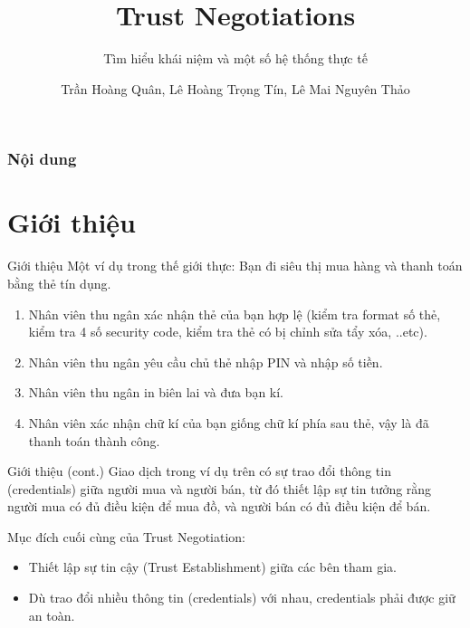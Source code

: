\documentclass[11pt]{beamer}
\newcommand{\eg}{\text{e.g.\ }}
\begin{document}
\author{Trần Hoàng Quân, Lê Hoàng Trọng Tín, Lê Mai Nguyên Thảo}
\title{Trust Negotiations}
\subtitle{Tìm hiểu khái niệm và một số hệ thống thực tế}
\begin{frame}[plain]
\maketitle
\end{frame}

\begin{frame}
\frametitle{Nội dung}
\tableofcontents
\end{frame}

\section{Giới thiệu}
\begin{frame}{Giới thiệu}
Một ví dụ trong thế giới thực: Bạn đi siêu thị mua hàng và thanh toán bằng thẻ tín dụng.
\begin{enumerate}
\item Nhân viên thu ngân xác nhận thẻ của bạn hợp lệ (\eg kiểm tra format số thẻ, kiểm tra 4 số security code, kiểm tra thẻ có bị chỉnh sửa tẩy xóa, ..etc).
\item Nhân viên thu ngân yêu cầu chủ thẻ nhập PIN và nhập số tiền.
\item Nhân viên thu ngân in biên lai và đưa bạn kí.
\item Nhân viên xác nhận chữ kí của bạn giống chữ kí phía sau thẻ, vậy là đã thanh toán thành công.
\end{enumerate}
\end{frame}

\begin{frame}{Giới thiệu (cont.)}
Giao dịch trong ví dụ trên có sự trao đổi thông tin (credentials) giữa người mua và người bán, từ đó thiết lập sự tin tưởng rằng người mua có đủ điều kiện để mua đồ, và người bán có đủ điều kiện để bán.

Mục đích cuối cùng của Trust Negotiation:
\begin{itemize}
\item Thiết lập sự tin cậy (Trust Establishment) giữa các bên tham gia.
\item Dù trao đổi nhiều thông tin (credentials) với nhau, credentials phải được giữ an toàn.
\end{itemize}
\end{frame}
\end{document}
